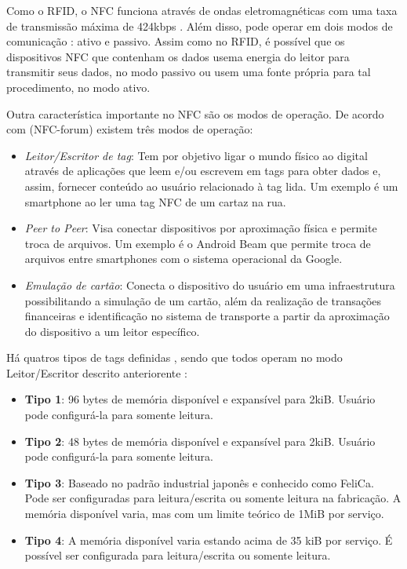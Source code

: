 \documentclass[
	article,			%
	11pt,				%
	oneside,			%
	a4paper,			%
	section=TITLE,		%
	subsection=TITLE,	%
	english,			%
	brazil,				%
	sumario=tradicional
	]{abntex2}
\begin{document}
Como o RFID, o NFC funciona através de ondas eletromagnéticas com uma taxa de transmissão máxima de 
424kbps \cite{nfcforumabout2017}. Além disso, pode operar em dois modos de comunicação 
\cite{brianjepsondoncolemantomigoe2014}: ativo e passivo. Assim como no RFID, é possível que os 
dispositivos NFC que contenham 
os dados usema energia do leitor para transmitir seus dados, no modo passivo ou usem uma fonte 
própria para tal procedimento, no modo ativo.


Outra característica importante no NFC são os modos de operação. De acordo com (NFC-forum) existem 
três modos de operação:

\begin{itemize} \parskip -4pt
	\item \textit{Leitor/Escritor de tag}: Tem por objetivo ligar o mundo físico ao digital através 
	de aplicações que leem e/ou escrevem em tags para obter dados e, assim, fornecer conteúdo ao 
	usuário relacionado à tag lida. Um exemplo é um smartphone ao ler uma tag NFC de um cartaz na 
	rua.
	\item \textit{Peer to Peer}: Visa conectar dispositivos por aproximação física e permite troca 
	de arquivos. Um exemplo é o Android Beam que permite troca de arquivos entre smartphones com o 
	sistema operacional da Google.
	\item \textit{Emulação de cartão}: Conecta o dispositivo do usuário em uma infraestrutura 
	possibilitando a simulação de um cartão, além da realização de transações financeiras e 
	identificação no sistema de transporte a partir da aproximação do dispositivo a um leitor 
	específico.
\end{itemize}

Há quatros tipos de tags definidas \cite{nfcforumtypespec2017}, sendo que todos operam no modo 
Leitor/Escritor descrito anteriorente : 

\begin{itemize} \parskip -4pt
	\item \textbf{Tipo 1}: 96 bytes de memória disponível e expansível para 2kiB. Usuário pode 
	configurá-la para somente leitura.
	\item \textbf{Tipo 2}: 48 bytes de memória disponível e expansível para 2kiB. Usuário pode 
	configurá-la para somente leitura.
	\item \textbf{Tipo 3}: Baseado no padrão industrial japonês e conhecido como FeliCa. Pode ser 
	configuradas para leitura/escrita ou somente leitura na fabricação. A memória disponível varia, 
	mas com um limite teórico de 1MiB por serviço.
	\item \textbf{Tipo 4}: A memória disponível varia estando acima de 35 kiB por serviço. É 
	possível ser configurada para leitura/escrita ou somente leitura.
\end{itemize}
\end{document}
